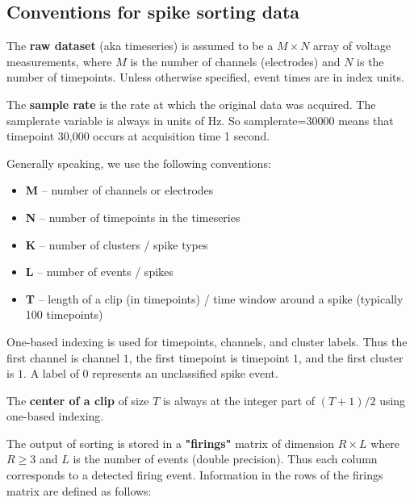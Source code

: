 \documentclass{article}
\begin{document}
\subsection{Conventions for spike sorting data}

The \textbf{raw dataset} (aka timeseries) is assumed to be a $M\times N$ array of voltage measurements, where $M$ is the number of channels (electrodes) and $N$ is the number of timepoints. Unless otherwise specified, event times are in index units.

The \textbf{sample rate} is the rate at which the original data was acquired. The samplerate variable is always in units of Hz. So samplerate=30000 means that timepoint 30,000 occurs at acquisition time 1 second.

Generally speaking, we use the following conventions:

\begin{itemize}
\item{\textbf{M} -- number of channels or electrodes}
\item{\textbf{N} -- number of timepoints in the timeseries}
\item{\textbf{K} -- number of clusters / spike types}
\item{\textbf{L} -- number of events / spikes}
\item{\textbf{T} -- length of a clip (in timepoints) / time window around a spike (typically 100 timepoints)}
\end{itemize}

One-based indexing is used for timepoints, channels, and cluster labels. Thus the first channel is channel $1$, the first timepoint is timepoint $1$, and the first cluster is $1$. A label of $0$ represents an unclassified spike event.

The \textbf{center of a clip} of size $T$ is always at the integer part of $(T+1)/2$ using one-based indexing.

The output of sorting is stored in a \textbf{"firings"} matrix of dimension $R\times L$ where $R\geq 3$ and $L$ is the number of events (double precision). Thus each column corresponds to a detected firing event. Information in the rows of the firings matrix are defined as follows:
\end{document}
